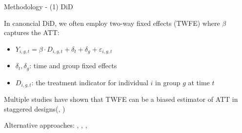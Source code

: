 \documentclass[aspectratio=169,xcolor=dvipsnames]{beamer}
\newenvironment{wideitemize}{\itemize\addtolength{\itemsep}{10pt}}{\enditemize}
\begin{document}
\begin{frame}{Methodology - (1) \textcite{sun_estimating_2021} DiD}
    \begin{wideitemize}
        \item In canoncial DiD, we often employ two-way fixed effects (TWFE) where $\beta$ captures the ATT:
        \begin{itemize}
            \item $Y_{i,g,t} = \beta\cdot D_{i,g,t} + \delta_t + \delta_g  + \varepsilon_{i,g,t}$
            \item $\delta_t, \delta_g$: time and group fixed effects
            \item $D_{i,g,t}$: the treatment indicator for individual $i$ in group $g$ at time $t$
        \end{itemize}
        \item Multiple studies have shown that TWFE can be a biased estimator of ATT in staggered designs{\scriptsize(\cite{goodman2021difference}, \cite{de2020two})}
        \item Alternative approaches: \textcite{sun_estimating_2021}, \textcite{callaway2021difference}, \textcite{borusyak2024revisiting}, \textcite{athey2021matrix}
    \end{wideitemize}
\end{frame}
\end{document}
